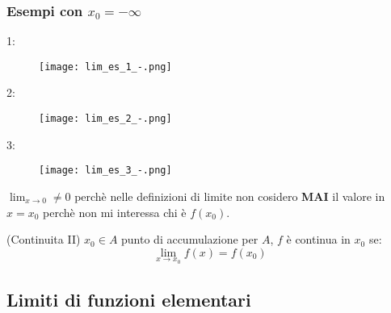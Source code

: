 \documentclass[../main.tex, class=article, 12pt]{subfiles}
\begin{document}
\subsubsection{Esempi con $ x_0 = -\infty $}
\begin{exmp}
       1:
       \begin{figure}[H]
         	\texttt{[image: lim\_es\_1\_-.png]}
         	\caption{}
       \end{figure}
       
\end{exmp}
\begin{exmp}
       2:
       \begin{figure}[H]
         	\texttt{[image: lim\_es\_2\_-.png]}
         	\caption{}
       \end{figure}
       
\end{exmp}
\begin{exmp}
       3:
       \begin{figure}[H]
         	\texttt{[image: lim\_es\_3\_-.png]}
         	\caption{}
       \end{figure}
\end{exmp}



$ \lim_{x \to 0} \not = 0 $ perchè nelle definizioni di limite non cosidero \textbf{MAI} il valore in $x = x_0$ perchè non mi interessa chi è $ f(x_0) $.

\begin{definition}
        (Continuita II) \newline
        $ x_0 \in A $ punto di accumulazione per $ A $, $ f $ è continua in $x_0$ se:
        \begin{equation*}
                \lim_{x \to x_0} f(x) = f(x_0)
        \end{equation*}
\end{definition}



\subsection{Limiti di funzioni elementari}\label{sec:limiti_di_funzioni_elementari}
\end{document}
